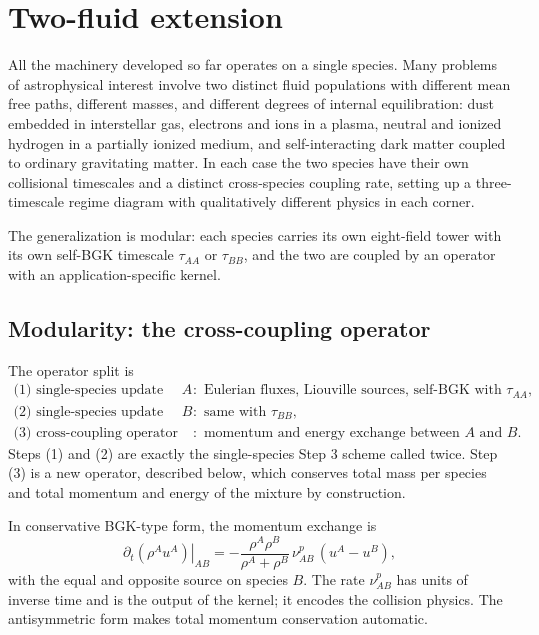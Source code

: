 \documentclass[11pt,letterpaper]{article}
\begin{document}
\section{Two-fluid extension}
\label{sec:twofluid}

All the machinery developed so far operates on a single species. Many problems of astrophysical interest involve two distinct fluid populations with different mean free paths, different masses, and different degrees of internal equilibration: dust embedded in interstellar gas, electrons and ions in a plasma, neutral and ionized hydrogen in a partially ionized medium, and self-interacting dark matter coupled to ordinary gravitating matter. In each case the two species have their own collisional timescales and a distinct cross-species coupling rate, setting up a three-timescale regime diagram with qualitatively different physics in each corner.

The generalization is modular: each species carries its own eight-field tower with its own self-BGK timescale $\tau_{AA}$ or $\tau_{BB}$, and the two are coupled by an operator with an application-specific kernel.

\subsection{Modularity: the cross-coupling operator}

The operator split is
\begin{equation}
\begin{aligned}
\text{(1) single-species update for } A & : \text{ Eulerian fluxes, Liouville sources, self-BGK with }\tau_{AA}, \\
\text{(2) single-species update for } B & : \text{ same with }\tau_{BB}, \\
\text{(3) cross-coupling operator} & : \text{ momentum and energy exchange between }A\text{ and }B.
\end{aligned}
\end{equation}
Steps (1) and (2) are exactly the single-species Step 3 scheme called twice. Step (3) is a new operator, described below, which conserves total mass per species and total momentum and energy of the mixture by construction.

In conservative BGK-type form, the momentum exchange is
\begin{equation}
\left.\partial_t(\rho^A u^A)\right|_{AB} = -\frac{\rho^A \rho^B}{\rho^A + \rho^B}\,\nu^p_{AB}\,(u^A - u^B),
\end{equation}
with the equal and opposite source on species $B$. The rate $\nu^p_{AB}$ has units of inverse time and is the output of the kernel; it encodes the collision physics. The antisymmetric form makes total momentum conservation automatic.
\end{document}
